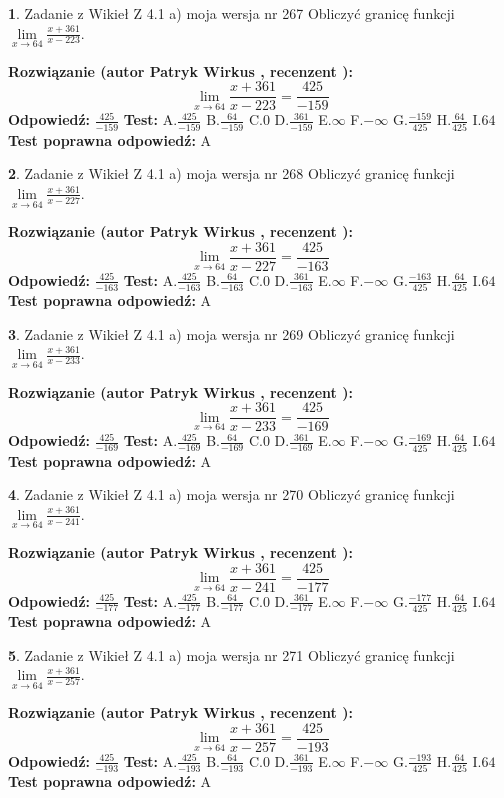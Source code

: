 \documentclass[12pt, a4paper]{article}
\theoremstyle{definition} %
\newtheorem{zad}{}
\newcommand{\zadStart}[1]{\begin{zad}#1\newline}
\newcommand{\zadStop}{\end{zad}}
\newcommand{\rozwStart}[2]{\noindent \textbf{Rozwiązanie (autor #1 , recenzent #2): }\newline}
\newcommand{\rozwStop}{\newline}
\newcommand{\odpStart}{\noindent \textbf{Odpowiedź:}\newline}
\newcommand{\odpStop}{\newline}
\newcommand{\testStart}{\noindent \textbf{Test:}\newline}
\newcommand{\testStop}{\newline}
\newcommand{\kluczStart}{\noindent \textbf{Test poprawna odpowiedź:}\newline}
\newcommand{\kluczStop}{\newline}
\begin{document}
\zadStart{Zadanie z Wikieł Z 4.1 a) moja wersja nr 267}
Obliczyć granicę funkcji $\lim\limits_{x\to64}\frac{x+361}{x-223}$.
\zadStop
\rozwStart{Patryk Wirkus}{}
$$\lim\limits_{x\to64}\frac{x+361}{x-223} = \frac{425}{-159}$$
\rozwStop
\odpStart
$\frac{425}{-159}$
\odpStop
\testStart
A.$\frac{425}{-159}$
B.$\frac{64}{-159}$
C.$0$
D.$\frac{361}{-159}$
E.$\infty$
F.$-\infty$
G.$\frac{-159}{425}$
H.$\frac{64}{425}$
I.$64$
\testStop
\kluczStart
A
\kluczStop



\zadStart{Zadanie z Wikieł Z 4.1 a) moja wersja nr 268}
Obliczyć granicę funkcji $\lim\limits_{x\to64}\frac{x+361}{x-227}$.
\zadStop
\rozwStart{Patryk Wirkus}{}
$$\lim\limits_{x\to64}\frac{x+361}{x-227} = \frac{425}{-163}$$
\rozwStop
\odpStart
$\frac{425}{-163}$
\odpStop
\testStart
A.$\frac{425}{-163}$
B.$\frac{64}{-163}$
C.$0$
D.$\frac{361}{-163}$
E.$\infty$
F.$-\infty$
G.$\frac{-163}{425}$
H.$\frac{64}{425}$
I.$64$
\testStop
\kluczStart
A
\kluczStop



\zadStart{Zadanie z Wikieł Z 4.1 a) moja wersja nr 269}
Obliczyć granicę funkcji $\lim\limits_{x\to64}\frac{x+361}{x-233}$.
\zadStop
\rozwStart{Patryk Wirkus}{}
$$\lim\limits_{x\to64}\frac{x+361}{x-233} = \frac{425}{-169}$$
\rozwStop
\odpStart
$\frac{425}{-169}$
\odpStop
\testStart
A.$\frac{425}{-169}$
B.$\frac{64}{-169}$
C.$0$
D.$\frac{361}{-169}$
E.$\infty$
F.$-\infty$
G.$\frac{-169}{425}$
H.$\frac{64}{425}$
I.$64$
\testStop
\kluczStart
A
\kluczStop



\zadStart{Zadanie z Wikieł Z 4.1 a) moja wersja nr 270}
Obliczyć granicę funkcji $\lim\limits_{x\to64}\frac{x+361}{x-241}$.
\zadStop
\rozwStart{Patryk Wirkus}{}
$$\lim\limits_{x\to64}\frac{x+361}{x-241} = \frac{425}{-177}$$
\rozwStop
\odpStart
$\frac{425}{-177}$
\odpStop
\testStart
A.$\frac{425}{-177}$
B.$\frac{64}{-177}$
C.$0$
D.$\frac{361}{-177}$
E.$\infty$
F.$-\infty$
G.$\frac{-177}{425}$
H.$\frac{64}{425}$
I.$64$
\testStop
\kluczStart
A
\kluczStop



\zadStart{Zadanie z Wikieł Z 4.1 a) moja wersja nr 271}
Obliczyć granicę funkcji $\lim\limits_{x\to64}\frac{x+361}{x-257}$.
\zadStop
\rozwStart{Patryk Wirkus}{}
$$\lim\limits_{x\to64}\frac{x+361}{x-257} = \frac{425}{-193}$$
\rozwStop
\odpStart
$\frac{425}{-193}$
\odpStop
\testStart
A.$\frac{425}{-193}$
B.$\frac{64}{-193}$
C.$0$
D.$\frac{361}{-193}$
E.$\infty$
F.$-\infty$
G.$\frac{-193}{425}$
H.$\frac{64}{425}$
I.$64$
\testStop
\kluczStart
A
\kluczStop
\end{document}
